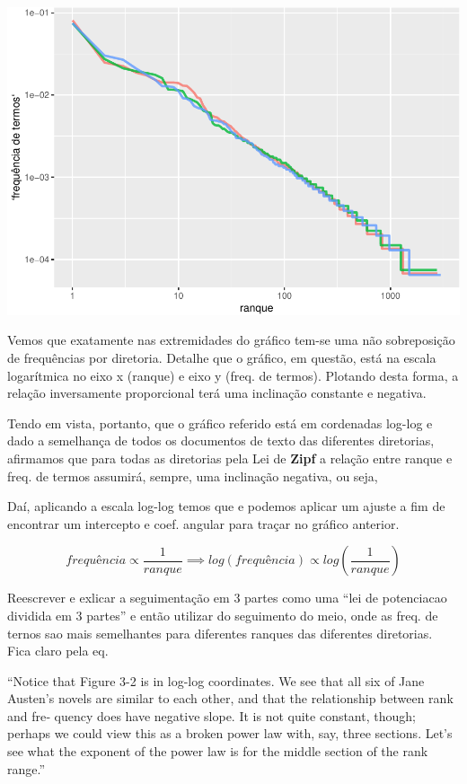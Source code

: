 \documentclass[]{article}
\begin{document}
\includegraphics{markdown_v40_files/figure-latex/unnamed-chunk-29-1.pdf}

Vemos que exatamente nas extremidades do gráfico tem-se uma não
sobreposição de frequências por diretoria. Detalhe que o gráfico, em
questão, está na escala logarítmica no eixo x (ranque) e eixo y (freq.
de termos). Plotando desta forma, a relação inversamente proporcional
terá uma inclinação constante e negativa.

Tendo em vista, portanto, que o gráfico referido está em cordenadas
log-log e dado a semelhança de todos os documentos de texto das
diferentes diretorias, afirmamos que para todas as diretorias pela Lei
de \textbf{Zipf} a relação entre ranque e freq. de termos assumirá,
sempre, uma inclinação negativa, ou seja,

Daí, aplicando a escala log-log temos que e podemos aplicar um ajuste a
fim de encontrar um intercepto e coef. angular para traçar no gráfico
anterior.

\[
frequência \propto \frac{1}{ranque} \implies log(frequência) \propto log\left(\frac{1}{ranque}\right)
\]

Reescrever e exlicar a seguimentação em 3 partes como uma ``lei de
potenciacao dividida em 3 partes'' e então utilizar do seguimento do
meio, onde as freq. de ternos sao mais semelhantes para diferentes
ranques das diferentes diretorias. Fica claro pela eq.

``Notice that Figure 3-2 is in log-log coordinates. We see that all six
of Jane Austen's novels are similar to each other, and that the
relationship between rank and fre‐ quency does have negative slope. It
is not quite constant, though; perhaps we could view this as a broken
power law with, say, three sections. Let's see what the exponent of the
power law is for the middle section of the rank range.''
\end{document}
